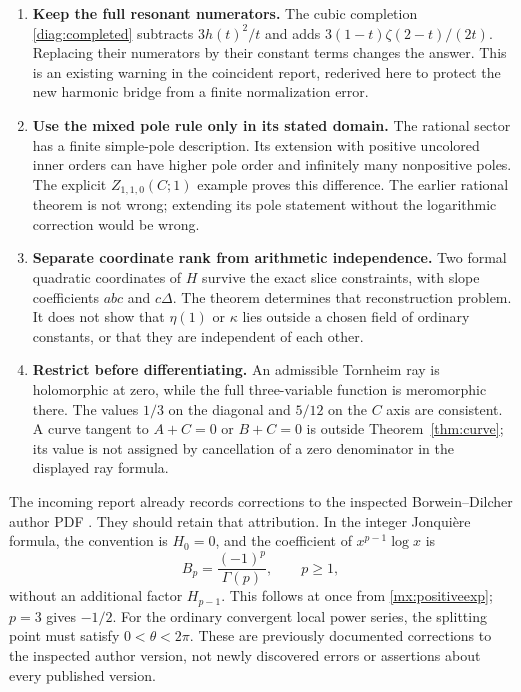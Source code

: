 \documentclass[11pt]{article}
\numberwithin{equation}{section}
\theoremstyle{definition}
\theoremstyle{remark}
\begin{document}
\begin{enumerate}
\item \textbf{Keep the full resonant numerators.}
The cubic completion \eqref{diag:completed} subtracts
$3h(t)^2/t$ and adds $3(1-t)\zeta(2-t)/(2t)$.
Replacing their numerators by their constant terms changes the
answer. This is an existing warning in the coincident report,
rederived here to protect the new harmonic bridge from a finite
normalization error.
\item \textbf{Use the mixed pole rule only in its stated domain.}
The rational sector has a finite simple-pole description. Its
extension with positive uncolored inner orders can have higher
pole order and infinitely many nonpositive poles. The explicit
$Z_{1,1,0}(C;1)$ example proves this difference. The earlier
rational theorem is not wrong; extending its pole statement without
the logarithmic correction would be wrong.
\item \textbf{Separate coordinate rank from arithmetic independence.}
Two formal quadratic coordinates of $H$ survive the exact slice
constraints, with slope coefficients $abc$ and $c\Delta$.
The theorem determines that reconstruction problem. It does not
show that $\eta(1)$ or $\kappa$ lies outside a chosen field of
ordinary constants, or that they are independent of each other.
\item \textbf{Restrict before differentiating.}
An admissible Tornheim ray is holomorphic at zero, while the full
three-variable function is meromorphic there. The values $1/3$ on
the diagonal and $5/12$ on the $C$ axis are consistent. A curve
tangent to $A+C=0$ or $B+C=0$ is outside
Theorem~\ref{thm:curve}; its value is not assigned by cancellation
of a zero denominator in the displayed ray formula.
\end{enumerate}

The incoming report already records corrections to the inspected
Borwein--Dilcher author PDF \cite{IncomingCoincident,BorweinDilcher}.
They should retain that attribution. In the integer Jonqui\`ere
formula, the convention is $H_0=0$, and the coefficient of
$x^{p-1}\log x$ is
\[
 B_p=\frac{(-1)^p}{\Gamma(p)},\qquad p\ge1,
\]
without an additional factor $H_{p-1}$. This follows at once from
\eqref{mx:positiveexp}; $p=3$ gives $-1/2$.
For the ordinary convergent local power series, the splitting point
must satisfy $0<\theta<2\pi$. These are previously documented
corrections to the inspected author version, not newly discovered
errors or assertions about every published version.
\end{document}
